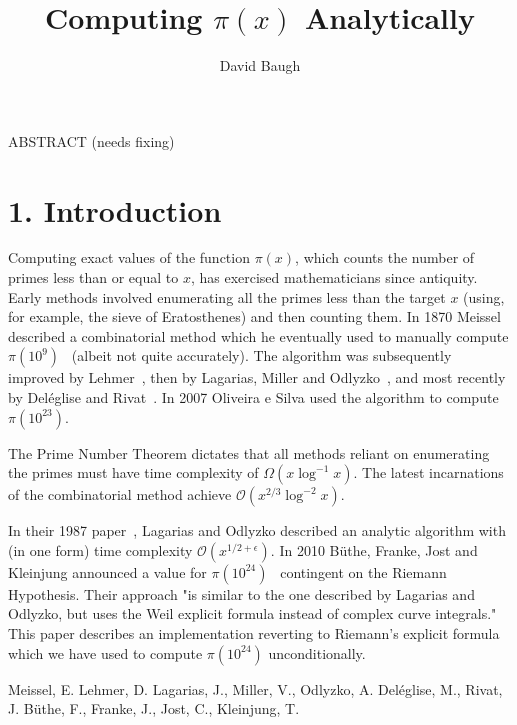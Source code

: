 \documentclass{article}
\title{Computing $\pi(x)$ Analytically}
\author{David Baugh}
\date{}
\begin{document}
\maketitle


    ABSTRACT (needs fixing)

\centering
\section*{\textnormal{1. Introduction}}
\flushleft

Computing exact values of the function $\pi(x)$, which counts the number of primes less than or equal to $x$, has exercised mathematicians since antiquity. Early methods involved enumerating all the primes less than the target $x$ (using, for example, the sieve of Eratosthenes) and then counting them. In 1870 Meissel~\cite{Meissel} described a combinatorial method which he eventually used to manually compute $\pi(10^9)$~\cite{Lehmer} (albeit not quite accurately). The algorithm was subsequently improved by Lehmer~\cite{Lehmer}, then by Lagarias, Miller and Odlyzko~\cite{Lagarias}, and most recently by Deléglise and Rivat~\cite{Deleglise}. In 2007 Oliveira e Silva used the algorithm to compute $\pi(10^{23})$.

The Prime Number Theorem dictates that all methods reliant on enumerating the primes must have time complexity of $\Omega(x\log^{-1} x)$. The latest incarnations of the combinatorial method achieve $\mathcal{O}(x^{2/3} \log^{-2} x)$.

In their 1987 paper~\cite{Lagarias}, Lagarias and Odlyzko described an analytic algorithm with (in one form) time complexity $\mathcal{O}(x^{1/2+\epsilon})$. In 2010 Büthe, Franke, Jost and Kleinjung announced a value for $\pi(10^{24})$~\cite{Buthe} contingent on the Riemann Hypothesis. Their approach "is similar to the one described by Lagarias and Odlyzko, but uses the Weil explicit formula instead of complex curve integrals." This paper describes an implementation reverting to Riemann’s explicit formula which we have used to compute $\pi(10^{24})$ unconditionally.

\begin{thebibliography}{99}
 Meissel, E.
 Lehmer, D.
 Lagarias, J., Miller, V., Odlyzko, A.
 Deléglise, M., Rivat, J.
 Büthe, F., Franke, J., Jost, C., Kleinjung, T.
\end{thebibliography}
\end{document}
